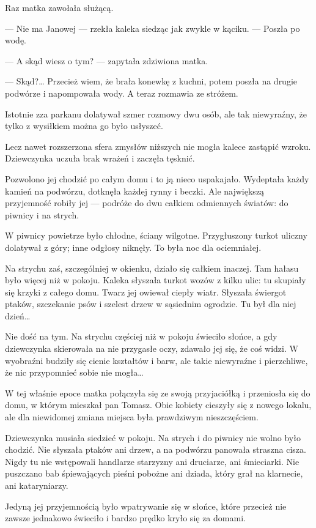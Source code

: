 Raz matka zawołała służącą.

— Nie ma Janowej — rzekła kaleka siedząc jak zwykle w kąciku. — Poszła
po wodę.

— A skąd wiesz o tym? — zapytała zdziwiona matka.

— Skąd?… Przecież wiem, że brała konewkę z kuchni, potem poszła na
drugie podwórze i napompowała wody. A teraz rozmawia ze stróżem.

Istotnie zza parkanu dolatywał szmer rozmowy dwu osób, ale tak
niewyraźny, że tylko z wysiłkiem można go było usłyszeć.

Lecz nawet rozszerzona sfera zmysłów niższych nie mogła kalece
zastąpić wzroku. Dziewczynka uczuła brak wrażeń i zaczęła tęsknić.

Pozwolono jej chodzić po całym domu i to ją nieco
uspakajało. Wydeptała każdy kamień na podwórzu, dotknęła każdej rynny
i beczki. Ale największą przyjemność robiły jej — podróże do dwu
całkiem odmiennych światów: do piwnicy i na strych.

W piwnicy powietrze było chłodne, ściany wilgotne. Przygłuszony turkot
uliczny dolatywał z góry; inne odgłosy niknęły. To była noc dla
ociemniałej.

Na strychu zaś, szczególniej w okienku, działo się całkiem
inaczej. Tam hałasu było więcej niż w pokoju. Kaleka słyszała turkot
wozów z kilku ulic: tu skupiały się krzyki z całego domu. Twarz jej
owiewał ciepły wiatr. Słyszała świergot ptaków, szczekanie psów i
szelest drzew w sąsiednim ogrodzie. Tu był dla niej dzień…

Nie dość na tym. Na strychu częściej niż w pokoju świeciło słońce, a
gdy dziewczynka skierowała na nie przygasłe oczy, zdawało jej się, że
coś widzi. W wyobraźni budziły się cienie kształtów i barw, ale takie
niewyraźne i pierzchliwe, że nic przypomnieć sobie nie mogła…

W tej właśnie epoce matka połączyła się ze swoją przyjaciółką i
przeniosła się do domu, w którym mieszkał pan Tomasz. Obie kobiety
cieszyły się z nowego lokalu, ale dla niewidomej zmiana miejsca była
prawdziwym nieszczęściem.

Dziewczynka musiała siedzieć w pokoju. Na strych i do piwnicy nie
wolno było chodzić. Nie słyszała ptaków ani drzew, a na podwórzu
panowała straszna cisza. Nigdy tu nie wstępowali handlarze starzyzny
ani druciarze, ani śmieciarki. Nie puszczano bab śpiewających pieśni
pobożne ani dziada, który grał na klarnecie, ani kataryniarzy.

Jedyną jej przyjemnością było wpatrywanie się w słońce, które przecież
nie zawsze jednakowo świeciło i bardzo prędko kryło się za domami.

